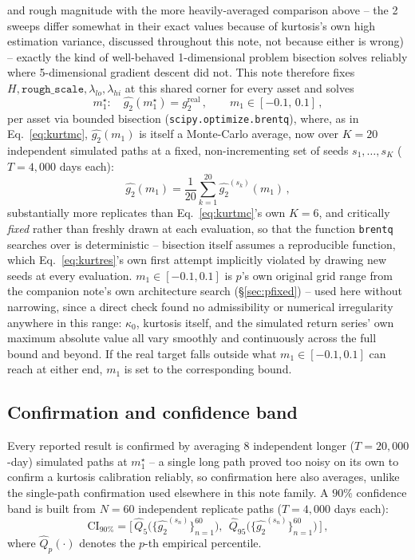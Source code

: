 \documentclass[11pt]{article}
\begin{document}
and rough magnitude with the more heavily-averaged comparison above -- the
2 sweeps differ somewhat in their exact values because of kurtosis's own
high estimation variance, discussed throughout this note, not because
either is wrong) -- exactly the kind of well-behaved 1-dimensional problem
bisection solves reliably where 5-dimensional gradient descent did not.
This note therefore fixes $H,\texttt{rough\_scale},\lambda_{lo},\lambda_{hi}$
at this shared corner for every asset and solves
\begin{equation}
m_1^\star : \quad \widehat{g_2}(m_1^\star) = g_2^{\text{real}}\, ,
\qquad m_1\in[-0.1,\,0.1]\, ,
\label{eq:kurtbisect}
\end{equation}
per asset via bounded bisection (\texttt{scipy.optimize.brentq}), where, as
in Eq.~\ref{eq:kurtmc}, $\widehat{g_2}(m_1)$ is itself a Monte-Carlo average,
now over $K=20$ independent simulated paths at a fixed, non-incrementing set
of seeds $s_1,\dots,s_K$ ($T=4{,}000$ days each):
\begin{equation}
\widehat{g_2}(m_1) = \frac{1}{20}\sum_{k=1}^{20}\widehat{g_2}^{(s_k)}(m_1)\, ,
\label{eq:kurtbisectmc}
\end{equation}
substantially more replicates than Eq.~\ref{eq:kurtmc}'s own $K=6$, and
critically \emph{fixed} rather than freshly drawn at each evaluation, so
that the function \texttt{brentq} searches over is deterministic -- bisection
itself assumes a reproducible function, which Eq.~\ref{eq:kurtres}'s own
first attempt implicitly violated by drawing new seeds at every evaluation.
$m_1\in[-0.1,0.1]$ is $p$'s own original grid range from the companion
note's own architecture search (\S\ref{sec:pfixed}) -- used here without
narrowing, since a direct check found no admissibility or numerical
irregularity anywhere in this range: $\kappa_0$, kurtosis itself, and the
simulated return series' own maximum absolute value all vary smoothly and
continuously across the full bound and beyond. If the real target falls
outside what $m_1\in[-0.1,0.1]$ can reach at either end, $m_1$ is set to the
corresponding bound.

\subsection{Confirmation and confidence band}
\label{sec:confirmation}
Every reported result is confirmed by averaging $8$ independent longer
($T=20{,}000$-day) simulated paths at $m_1^\star$ -- a single long path
proved too noisy on its own to confirm a kurtosis calibration reliably, so
confirmation here also averages, unlike the single-path confirmation used
elsewhere in this note family. A $90\%$ confidence band is built from
$N=60$ independent replicate paths ($T=4{,}000$ days each):
\begin{equation}
\text{CI}_{90\%} = \Big[\,
\widehat{Q}_{5}\big(\{\widehat{g_2}^{(s_n)}\}_{n=1}^{60}\big),\ \
\widehat{Q}_{95}\big(\{\widehat{g_2}^{(s_n)}\}_{n=1}^{60}\big)
\,\Big]\, ,
\label{eq:kurtci}
\end{equation}
where $\widehat{Q}_p(\cdot)$ denotes the $p$-th empirical percentile.
\end{document}
